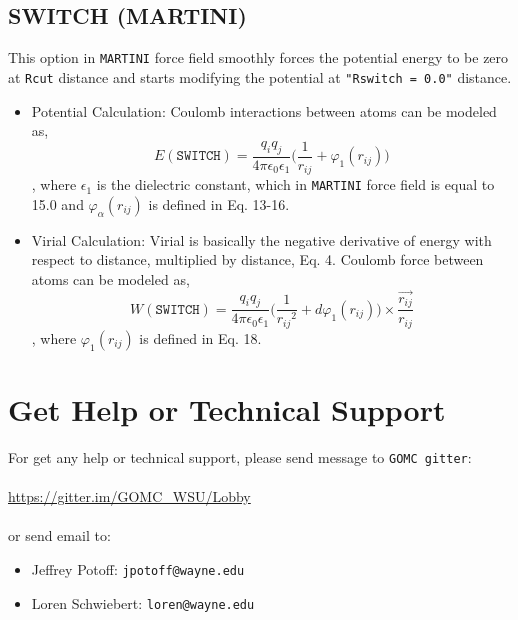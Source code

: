 \subsection{SWITCH (MARTINI)} This option in \texttt{MARTINI} force field smoothly forces the potential energy to be zero at \texttt{Rcut} distance and starts modifying the potential at \texttt{"Rswitch = 0.0"} distance.
\begin{itemize}
	\item Potential Calculation: Coulomb interactions between atoms can be modeled as,
	\begin{equation}
		E(\texttt{SWITCH}) = \frac{q_i q_j}{4\pi \epsilon_0 \epsilon_1} \bigg( \frac{1}{r_{ij}} + \varphi_{1} (r_{ij}) \bigg)
	\end{equation}
	, where $\epsilon_1$ is the dielectric constant, which in \texttt{MARTINI} force field is equal to 15.0 and $\varphi_{\alpha} (r_{ij})$ is defined in Eq. 13-16.
	
	\item Virial Calculation: Virial is basically the negative derivative of energy with respect to distance, multiplied by distance, Eq. 4. Coulomb force between atoms can be modeled as,\\
	\begin{equation}
		W(\texttt{SWITCH}) =  \frac{q_i q_j}{4\pi \epsilon_0 \epsilon_1} \bigg( \frac{1}{{r_{ij}}^2} + d\varphi_1 (r_{ij})  \bigg) \times \frac{\overrightarrow{r_{ij}}}{r_{ij}}
	\end{equation}
	, where $\varphi_1 (r_{ij})$ is defined in Eq. 18.	
\end{itemize}
\newpage

\section{Get Help or Technical Support }

For get any help or technical support, please send message to \texttt{GOMC gitter}:\\\\
\url{https://gitter.im/GOMC_WSU/Lobby} \\\\
or send email to:\\
\begin{itemize}

	\item Jeffrey Potoff:  \texttt{jpotoff@wayne.edu}
	\item Loren Schwiebert: \texttt{loren@wayne.edu}
	
\end{itemize}


